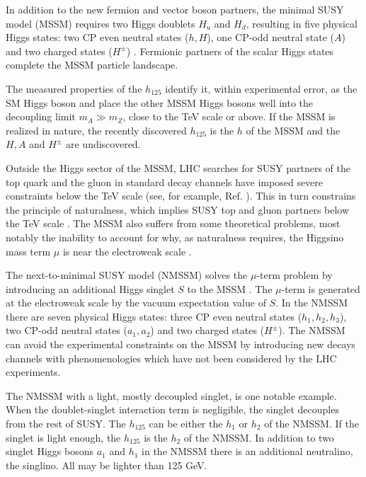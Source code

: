 \documentclass{ws-ijmpa}
\begin{document}
In addition to the new fermion and vector boson partners, the minimal SUSY model (MSSM) requires two Higgs doublets $H_{u}$ and $H_{d}$, resulting in five physical Higgs states: two CP even neutral states ($h,H$), one CP-odd neutral state ($A$) and two charged states ($H^{\pm}$) \cite{Carena:2002es}. Fermionic partners of the scalar Higgs states complete the MSSM particle landscape. 

The measured properties of the $h_{125}$  \cite{Khachatryan:2016vau} identify it, within experimental error, as the SM Higgs boson and place the other MSSM Higgs bosons well into the decoupling limit $m_{A} \gg m_{Z}$, close to the TeV scale or above. If the MSSM is realized in nature, the recently discovered $h_{125}$ is the $h$ of the MSSM and the $H,A$ and $H^{\pm}$ are undiscovered.

Outside the Higgs sector of the MSSM, LHC searches for SUSY partners of the top quark and the gluon in standard decay channels have imposed severe constraints below the TeV scale (see, for example, Ref. ). This in turn constrains the principle of naturalness, which implies SUSY top and gluon partners below the TeV scale \cite{Papucci:2011wy}. The MSSM also suffers from some theoretical problems, most notably the  inability to account for why, as naturalness requires, the Higgsino mass term $\mu$ is near the electroweak scale \cite{Martin:1997ns}.

The next-to-minimal SUSY model (NMSSM) solves the $\mu$-term problem by introducing an additional Higgs singlet $S$ to the MSSM \cite{Ellwanger:2009dp,Maniatis:2009re}. The $\mu$-term is generated at the electroweak scale by the vacuum expectation value of $S$. In the NMSSM there are seven physical Higgs states: three CP even neutral states ($h_1,h_2,h_3$), two CP-odd neutral states ($a_1,a_2$) and two charged states ($H^{\pm}$). The NMSSM can avoid the experimental constraints on the MSSM by introducing new decays channels with phenomenologies which have not been considered by the LHC experiments. 
 

The NMSSM with a light, mostly decoupled singlet, is one notable example. When the doublet-singlet interaction term  is negligible, the singlet decouples from the rest of SUSY. The $h_{125}$ can be either the $h_1$ or $h_2$ of the NMSSM. If the singlet is light enough, the $h_{125}$ is the $h_2$ of the NMSSM. In addition to two singlet Higgs bosons $a_1$ and $h_1$ in the NMSSM there is an additional neutralino, the singlino. All may be lighter than 125 GeV.
\end{document}
